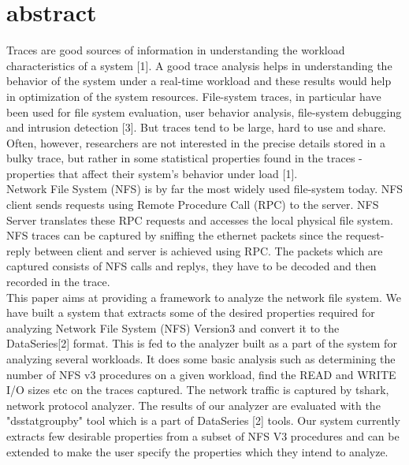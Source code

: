\documentclass[conference]{IEEEtran}
\begin{document}
\section{abstract}
\indent
Traces are good sources of information in understanding the workload 
characteristics of a system [1]. A good trace analysis helps in understanding 
the behavior of the system under a real-time workload and these results would 
help in optimization of the system resources. File-system traces, in particular 
have been used for file system evaluation, user behavior analysis, file-system 
debugging and intrusion detection [3]. But traces tend to be large, hard to use 
and share. Often, however, researchers are not interested in the precise details
stored in a bulky trace, but rather in some statistical properties found in the 
traces - properties that affect their system's behavior under load [1].\\
\indent
Network File System (NFS) is by far the most widely used file-system today. 
NFS client sends requests using Remote Procedure Call (RPC) to the server. 
NFS Server translates these RPC requests and accesses the local physical file system. 
NFS traces can be captured by sniffing the ethernet packets since the request-reply 
between client and server is achieved using RPC. The packets which are captured 
consists of NFS calls and replys, they have to be decoded and then recorded in the 
trace. \\
\indent
This paper aims at providing a framework to analyze the network file 
system. We have built a system that extracts some of the desired properties required 
for analyzing Network File System (NFS) Version3 and convert it
 to the DataSeries[2] format. This is fed to the analyzer built as a part of the system 
for analyzing several workloads. It does some basic analysis such as determining the number of
NFS v3 procedures on a given workload, find the READ and WRITE I/O sizes etc on the traces captured. The network traffic is captured by tshark, network protocol 
analyzer. The results of our analyzer are evaluated with the "dsstatgroupby" tool which is a part of DataSeries [2] tools. Our system currently extracts few desirable properties from a subset of NFS V3 
procedures and can be extended to make the user specify the properties which they intend to analyze.\\

\end{document}
